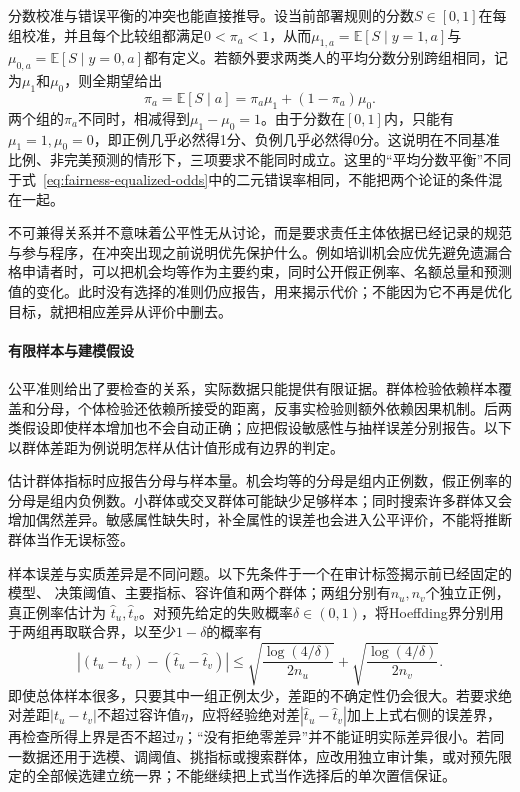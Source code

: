 分数校准与错误平衡的冲突也能直接推导。设当前部署规则的分数$S\in[0,1]$在每组校准，并且每个比较组都满足$0<\pi_a<1$，从而$\mu_{1,a}=\mathbb E[S\mid y=1,a]$与$\mu_{0,a}=\mathbb E[S\mid y=0,a]$都有定义。若额外要求两类人的平均分数分别跨组相同，记为$\mu_1$和$\mu_0$，则全期望给出
\[
 \pi_a=\mathbb E[S\mid a]
       =\pi_a\mu_1+(1-\pi_a)\mu_0.
\]
两个组的$\pi_a$不同时，相减得到$\mu_1-\mu_0=1$。由于分数在$[0,1]$内，只能有$\mu_1=1,\mu_0=0$，即正例几乎必然得1分、负例几乎必然得0分。这说明在不同基准比例、非完美预测的情形下，三项要求不能同时成立。这里的“平均分数平衡”不同于式~\eqref{eq:fairness-equalized-odds}中的二元错误率相同，不能把两个论证的条件混在一起。

不可兼得关系并不意味着公平性无从讨论，而是要求责任主体依据已经记录的规范与参与程序，在冲突出现之前说明优先保护什么。例如培训机会应优先避免遗漏合格申请者时，可以把机会均等作为主要约束，同时公开假正例率、名额总量和预测值的变化。此时没有选择的准则仍应报告，用来揭示代价；不能因为它不再是优化目标，就把相应差异从评价中删去。

\paragraph{有限样本与建模假设}
\label{sec:fairness-evidence}

公平准则给出了要检查的关系，实际数据只能提供有限证据。群体检验依赖样本覆盖和分母，个体检验还依赖所接受的距离，反事实检验则额外依赖因果机制。后两类假设即使样本增加也不会自动正确；应把假设敏感性与抽样误差分别报告。以下以群体差距为例说明怎样从估计值形成有边界的判定。

估计群体指标时应报告分母与样本量。机会均等的分母是组内正例数，假正例率的分母是组内负例数。小群体或交叉群体可能缺少足够样本；同时搜索许多群体又会增加偶然差异。敏感属性缺失时，补全属性的误差也会进入公平评价，不能将推断群体当作无误标签。

样本误差与实质差异是不同问题。以下先条件于一个在审计标签揭示前已经固定的模型、
决策阈值、主要指标、容许值和两个群体；两组分别有$n_u,n_v$个独立正例，真正例率估计为
$\hat t_u,\hat t_v$。对预先给定的失败概率$\delta\in(0,1)$，将Hoeffding界分别用于两组再取联合界，以至少$1-\delta$的概率有
\[
 |(t_u-t_v)-(\hat t_u-\hat t_v)|
 \leq
 \sqrt{\frac{\log(4/\delta)}{2n_u}}
 +\sqrt{\frac{\log(4/\delta)}{2n_v}}.
\]
即使总体样本很多，只要其中一组正例太少，差距的不确定性仍会很大。若要求绝对差距$|t_u-t_v|$不超过容许值$\eta$，应将经验绝对差$|\hat t_u-\hat t_v|$加上上式右侧的误差界，再检查所得上界是否不超过$\eta$；“没有拒绝零差异”并不能证明实际差异很小。若同一数据还用于选模、调阈值、挑指标或搜索群体，应改用独立审计集，或对预先限定的全部候选建立统一界；不能继续把上式当作选择后的单次置信保证。

